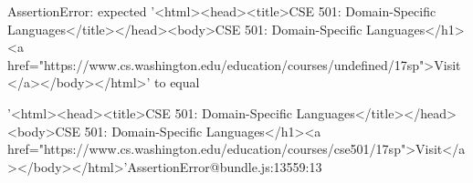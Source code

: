 AssertionError: expected '\n<html>\n    <head>\n        <title>CSE 501: Domain-Specific Languages</title>\n    </head>\n    <body>\n        CSE 501: Domain-Specific Languages\n    </h1>\n    <a href="https://www.cs.washington.edu/education/courses/undefined/17sp">Visit</a>\n    </body>\n</html>' to equal 


	'\n<html>\n    <head>\n        <title>CSE 501: Domain-Specific Languages</title>\n    </head>\n    <body>\n    <h1>\n        CSE 501: Domain-Specific Languages\n    </h1>\n    <a href="https://www.cs.washington.edu/education/courses/cse501/17sp">Visit</a>\n    </body>\n</html>'AssertionError@bundle.js:13559:13